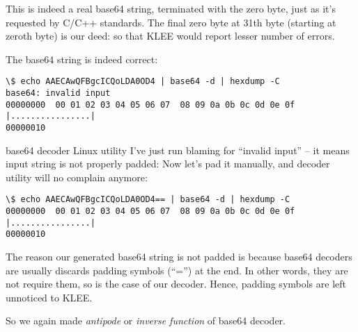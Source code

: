 This is indeed a real base64 string, terminated with the zero byte, just as it's requested by C/C++ standards.
The final zero byte at 31th byte (starting at zeroth byte) is our deed: so that KLEE would report lesser number of errors. %

The base64 string is indeed correct:

\begin{lstlisting}
\$ echo AAECAwQFBgcICQoLDA0OD4 | base64 -d | hexdump -C
base64: invalid input
00000000  00 01 02 03 04 05 06 07  08 09 0a 0b 0c 0d 0e 0f  |................|
00000010
\end{lstlisting}

base64 decoder Linux utility I've just run blaming for ``invalid input'' -- it means input string is not properly padded:
Now let's pad it manually, and decoder utility will no complain anymore:

\begin{lstlisting}
\$ echo AAECAwQFBgcICQoLDA0OD4== | base64 -d | hexdump -C
00000000  00 01 02 03 04 05 06 07  08 09 0a 0b 0c 0d 0e 0f  |................|
00000010
\end{lstlisting}

The reason our generated base64 string is not padded is because base64 decoders are usually discards padding symbols (``='') at the end.
In other words, they are not require them, so is the case of our decoder.
Hence, padding symbols are left unnoticed to KLEE.

So we again made \textit{antipode} or \textit{inverse function} of base64 decoder.

